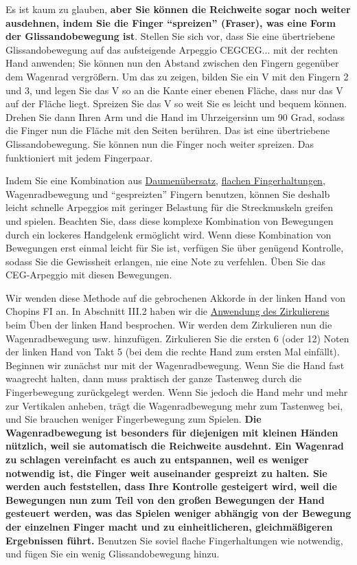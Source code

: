 Es ist kaum zu glauben, \textbf{aber Sie können die Reichweite sogar noch weiter ausdehnen, indem Sie die Finger \enquote{spreizen} (Fraser), was eine Form der Glissandobewegung ist}.
Stellen Sie sich vor, dass Sie eine übertriebene Glissandobewegung auf das aufsteigende Arpeggio CEGCEG... mit der rechten Hand anwenden;
Sie können nun den Abstand zwischen den Fingern gegenüber dem Wagenrad vergrößern.
Um das zu zeigen, bilden Sie ein V mit den Fingern 2 und 3, und legen Sie das V so an die Kante einer ebenen Fläche, dass nur das V auf der Fläche liegt.
Spreizen Sie das V so weit Sie es leicht und bequem können.
Drehen Sie dann Ihren Arm und die Hand im Uhrzeigersinn um 90 Grad, sodass die Finger nun die Fläche mit den Seiten berühren.
Das ist eine übertriebene Glissandobewegung.
Sie können nun die Finger noch weiter spreizen.
Das funktioniert mit jedem Fingerpaar.

Indem Sie eine Kombination aus \hyperref[c1iii5a]{Daumenübersatz}, \hyperref[c1iii4b]{flachen Fingerhaltungen}, Wagenradbewegung und \enquote{gespreizten} Fingern benutzen, können Sie deshalb leicht schnelle Arpeggios mit geringer Belastung für die Streckmuskeln greifen und spielen.
Beachten Sie, dass diese komplexe Kombination von Bewegungen durch ein lockeres Handgelenk ermöglicht wird.
Wenn diese Kombination von Bewegungen erst einmal leicht für Sie ist, verfügen Sie über genügend Kontrolle, sodass Sie die Gewissheit erlangen, nie eine Note zu verfehlen.
Üben Sie das CEG-Arpeggio mit diesen Bewegungen.

Wir wenden diese Methode auf die gebrochenen Akkorde in der linken Hand von Chopins FI an.
In Abschnitt III.2 haben wir die \hyperref[c1iii2]{Anwendung des Zirkulierens} beim Üben der linken Hand besprochen.
Wir werden dem Zirkulieren nun die Wagenradbewegung usw. hinzufügen.
Zirkulieren Sie die ersten 6 (oder 12) Noten der linken Hand von Takt 5 (bei dem die rechte Hand zum ersten Mal einfällt).
Beginnen wir zunächst nur mit der Wagenradbewegung.
Wenn Sie die Hand fast waagrecht halten, dann muss praktisch der ganze Tastenweg durch die Fingerbewegung zurückgelegt werden.
Wenn Sie jedoch die Hand mehr und mehr zur Vertikalen anheben, trägt die Wagenradbewegung mehr zum Tastenweg bei, und Sie brauchen weniger Fingerbewegung zum Spielen.
\textbf{Die Wagenradbewegung ist besonders für diejenigen mit kleinen Händen nützlich, weil sie automatisch die Reichweite ausdehnt.
Ein Wagenrad zu schlagen vereinfacht es auch zu entspannen, weil es weniger notwendig ist, die Finger weit auseinander gespreizt zu halten.
Sie werden auch feststellen, dass Ihre Kontrolle gesteigert wird, weil die Bewegungen nun zum Teil von den großen Bewegungen der Hand gesteuert werden, was das Spielen weniger abhängig von der Bewegung der einzelnen Finger macht und zu einheitlicheren, gleichmäßigeren Ergebnissen führt.}
Benutzen Sie soviel flache Fingerhaltungen wie notwendig, und fügen Sie ein wenig Glissandobewegung hinzu.  


